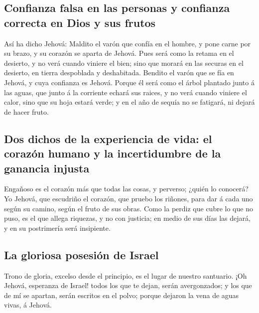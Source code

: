 \hypertarget{confianza-falsa-en-las-personas-y-confianza-correcta-en-dios-y-sus-frutos}{%
\subsection{Confianza falsa en las personas y confianza correcta en Dios
y sus
frutos}\label{confianza-falsa-en-las-personas-y-confianza-correcta-en-dios-y-sus-frutos}}

 Así ha dicho Jehová: Maldito el varón que confía en el
hombre, y pone carne por su brazo, y su corazón se aparta de Jehová.
 Pues será como la retama en el desierto, y no verá cuando
viniere el bien; sino que morará en las securas en el desierto, en
tierra despoblada y deshabitada.  Bendito el varón que se
fía en Jehová, y cuya confianza es Jehová.  Porque él será
como el árbol plantado junto á las aguas, que junto á la corriente
echará sus raices, y no verá cuando viniere el calor, sino que su hoja
estará verde; y en el año de sequía no se fatigará, ni dejará de hacer
fruto.

\hypertarget{dos-dichos-de-la-experiencia-de-vida-el-corazuxf3n-humano-y-la-incertidumbre-de-la-ganancia-injusta}{%
\subsection{Dos dichos de la experiencia de vida: el corazón humano y la
incertidumbre de la ganancia
injusta}\label{dos-dichos-de-la-experiencia-de-vida-el-corazuxf3n-humano-y-la-incertidumbre-de-la-ganancia-injusta}}

 Engañoso es el corazón más que todas las cosas, y perverso;
¿quién lo conocerá?  Yo Jehová, que escudriño el corazón,
que pruebo los riñones, para dar á cada uno según su camino, según el
fruto de sus obras.  Como la perdiz que cubre lo que no
puso, es el que allega riquezas, y no con justicia; en medio de sus días
las dejará, y en su postrimería será insipiente.

\hypertarget{la-gloriosa-posesiuxf3n-de-israel}{%
\subsection{La gloriosa posesión de
Israel}\label{la-gloriosa-posesiuxf3n-de-israel}}

 Trono de gloria, excelso desde el principio, es el lugar
de nuestro santuario.  ¡Oh Jehová, esperanza de Israel!
todos los que te dejan, serán avergonzados; y los que de mí se apartan,
serán escritos en el polvo; porque dejaron la vena de aguas vivas, á
Jehová.

